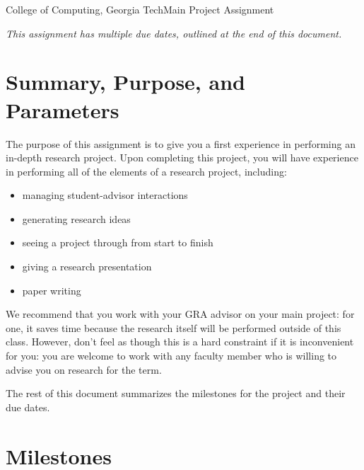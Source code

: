 \documentclass[11pt]{article}
\begin{document}


{College of Computing, Georgia Tech}{Main Project Assignment}

{\em This assignment has multiple due dates, outlined at the end of this
  document.}

\section{Summary, Purpose, and Parameters}

The purpose of this assignment is to give you a first experience in
performing an in-depth research project.  Upon completing this project,
you will have experience in performing all of the elements of a
research project, including:
\begin{itemize}
\itemsep=-1pt
\item managing student-advisor interactions
\item generating research ideas
\item seeing a project through from start to finish
\item giving a research presentation
\item paper writing
\end{itemize}
\noindent
We recommend that you work with your GRA advisor on your main project:
for one, it saves time because the research itself will be performed
outside of this class.  However, don't feel as though this is a hard
constraint if it is inconvenient for you: you are welcome to work with
any faculty member who is willing to advise you on research for the
term.

The rest of this document summarizes the milestones for the project and
their due dates.




\section{Milestones}
\end{document}
